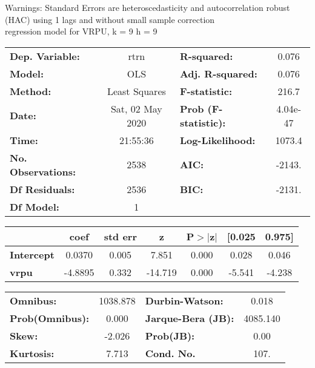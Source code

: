 Warnings: \newline
 [1] Standard Errors are heteroscedasticity and autocorrelation robust (HAC) using 1 lags and without small sample correction\\ 

regression model for VRPU, k = 9 h = 9\begin{center}
\begin{tabular}{lclc}
\toprule
\textbf{Dep. Variable:}    &       rtrn       & \textbf{  R-squared:         } &     0.076   \\
\textbf{Model:}            &       OLS        & \textbf{  Adj. R-squared:    } &     0.076   \\
\textbf{Method:}           &  Least Squares   & \textbf{  F-statistic:       } &     216.7   \\
\textbf{Date:}             & Sat, 02 May 2020 & \textbf{  Prob (F-statistic):} &  4.04e-47   \\
\textbf{Time:}             &     21:55:36     & \textbf{  Log-Likelihood:    } &    1073.4   \\
\textbf{No. Observations:} &        2538      & \textbf{  AIC:               } &    -2143.   \\
\textbf{Df Residuals:}     &        2536      & \textbf{  BIC:               } &    -2131.   \\
\textbf{Df Model:}         &           1      & \textbf{                     } &             \\
\bottomrule
\end{tabular}
\begin{tabular}{lcccccc}
                   & \textbf{coef} & \textbf{std err} & \textbf{z} & \textbf{P$> |$z$|$} & \textbf{[0.025} & \textbf{0.975]}  \\
\midrule
\textbf{Intercept} &       0.0370  &        0.005     &     7.851  &         0.000        &        0.028    &        0.046     \\
\textbf{vrpu}      &      -4.8895  &        0.332     &   -14.719  &         0.000        &       -5.541    &       -4.238     \\
\bottomrule
\end{tabular}
\begin{tabular}{lclc}
\textbf{Omnibus:}       & 1038.878 & \textbf{  Durbin-Watson:     } &    0.018  \\
\textbf{Prob(Omnibus):} &   0.000  & \textbf{  Jarque-Bera (JB):  } & 4085.140  \\
\textbf{Skew:}          &  -2.026  & \textbf{  Prob(JB):          } &     0.00  \\
\textbf{Kurtosis:}      &   7.713  & \textbf{  Cond. No.          } &     107.  \\
\bottomrule
\end{tabular}
\end{center}

